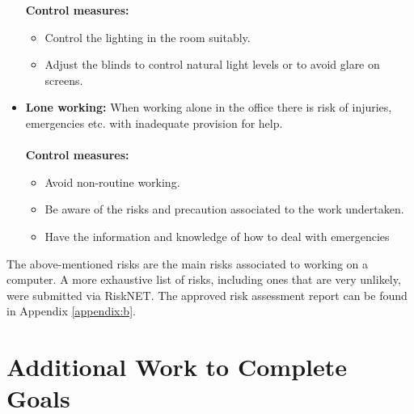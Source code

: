 \documentclass[a4paper,12pt]{report}
\begin{document}
\begin{itemize}
	\textbf{Control measures:}
	\begin{itemize}
		\item Control the lighting in the room suitably.
		\item Adjust the blinds to control natural light levels or to avoid glare on screens.
	\end{itemize}
	\item \textbf{Lone working:} When working alone in the office there is risk of injuries, emergencies etc. with inadequate provision for help.\\ \\
	\textbf{Control measures:}
	\begin{itemize}
		\item Avoid non-routine working.
		\item Be aware of the risks and precaution associated to the work undertaken.
		\item Have the information and knowledge of how to deal with emergencies
	\end{itemize}
\end{itemize}

The above-mentioned risks are the main risks associated to working on a computer. A more exhaustive list of risks, including ones that are very unlikely, were submitted via RiskNET. The approved risk assessment report can be found in Appendix \ref{appendix:b}.	


\section{Additional Work to Complete Goals}
\end{document}
